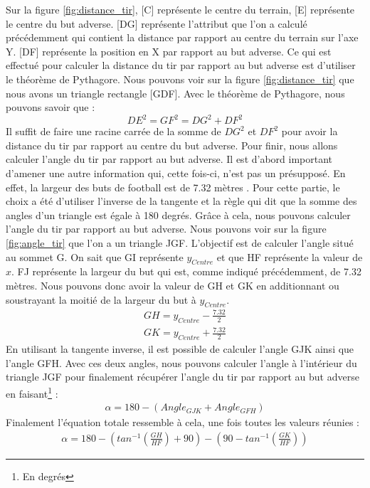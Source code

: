 \documentclass[12pt]{article}
\begin{document}
Sur la figure \ref{fig:distance_tir}, [C] représente le centre du terrain, [E] représente le centre du but adverse.
[DG] représente l'attribut que l'on a calculé précédemment qui contient la distance par rapport au centre du terrain sur l'axe Y.
[DF] représente la position en X par rapport au but adverse.
Ce qui est effectué pour calculer la distance du tir par rapport au but adverse est d'utiliser le théorème de Pythagore.
Nous pouvons voir sur la figure \ref{fig:distance_tir} que nous avons un triangle rectangle [GDF].
Avec le théorème de Pythagore, nous pouvons savoir que :
\begin{equation}
    DE^2 = GF^2 = DG^2 + DF^2
\end{equation}
Il suffit de faire une racine carrée de la somme de $DG^2$ et $DF^2$ pour avoir la distance du tir par rapport au centre du but adverse.
\newline\newline
Pour finir, nous allons calculer l'angle du tir par rapport au but adverse.
Il est d'abord important d'amener une autre information qui, cette fois-ci, n'est pas un présupposé.
En effet, la largeur des buts de football est de 7.32 mètres \cite{TerrainIFAB}.
Pour cette partie, le choix a été d'utiliser l'inverse de la tangente et la règle qui dit que la somme des angles d'un triangle est égale à 180 degrés.
Grâce à cela, nous pouvons calculer l'angle du tir par rapport au but adverse.
Nous pouvons voir sur la figure \ref{fig:angle_tir} que l'on a un triangle JGF.
L'objectif est de calculer l'angle situé au sommet G.
On sait que GI représente $y_{Centre}$ et que HF représente la valeur de $x$.
FJ représente la largeur du but qui est, comme indiqué précédemment, de 7.32 mètres.
Nous pouvons donc avoir la valeur de GH et GK en additionnant ou soustrayant la moitié de la largeur du but à $y_{Centre}$.
\begin{equation}
    \begin{split}
        GH = y_{Centre} - \frac{7.32}{2} \\
        GK = y_{Centre} + \frac{7.32}{2}
    \end{split}
\end{equation}
En utilisant la tangente inverse, il est possible de calculer l'angle GJK ainsi que l'angle GFH.
Avec ces deux angles, nous pouvons calculer l'angle à l'intérieur du triangle JGF pour finalement récupérer l'angle du tir par rapport au but adverse en faisant\footnote{En degrés} :
\begin{equation}
    \begin{split}
        \alpha = 180 - (Angle_{GJK} + Angle_{GFH})
    \end{split}
\end{equation}
Finalement l'équation totale ressemble à cela, une fois toutes les valeurs réunies :
\begin{equation}
    \begin{split}
        \alpha = 180 - (tan^{-1}(\frac{GH}{HF}) + 90) - (90 -tan^{-1}(\frac{GK}{HF}))
    \end{split}
\end{equation}
\end{document}
